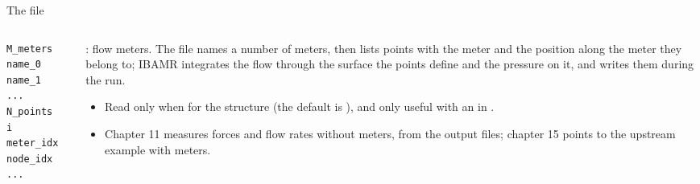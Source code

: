 \documentclass[aspectratio=169,11pt]{beamer}
\begin{document}
\begin{frame}[fragile]{The  file}
\begin{columns}[T,onlytextwidth]
\begin{column}{0.42\textwidth}
\begin{lstlisting}[style=data]
M_meters
name_0
name_1
...
N_points
i  meter_idx  node_idx
...
\end{lstlisting}
\end{column}
\begin{column}{0.56\textwidth}
\small {}: flow meters. The file names a number of meters, then lists points with the meter and the position along the meter they belong to; IBAMR integrates the flow through the surface the points define and the pressure on it, and writes them during the run.
\begin{itemize}
  \item Read only when  for the structure (the default is ), and only useful with an  in .
  \item Chapter 11 measures forces and flow rates without meters, from the output files; chapter 15 points to the upstream example with meters.
\end{itemize}
\end{column}
\end{columns}
\end{frame}
\end{document}
